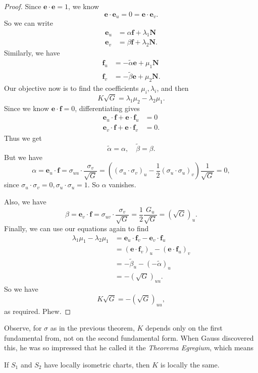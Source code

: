 \documentclass[a4paper]{article}
\begin{document}
\begin{proof}
  Since $\mathbf{e} \cdot \mathbf{e} = 1$, we know
  \[
    \mathbf{e}\cdot \mathbf{e}_u = 0 = \mathbf{e}\cdot \mathbf{e}_v.
  \]
  So we can write
  \begin{align*}
    \mathbf{e}_u &= \alpha \mathbf{f} + \lambda_1 \mathbf{N}\\
    \mathbf{e}_v &= \beta \mathbf{f} + \lambda_2 \mathbf{N}.
  \end{align*}
  Similarly, we have
  \begin{align*}
    \mathbf{f}_u &= -\tilde{\alpha}\mathbf{e} + \mu_1 \mathbf{N}\\
    \mathbf{f}_v &= -\tilde{\beta}\mathbf{e} + \mu_2 \mathbf{N}.
  \end{align*}
  Our objective now is to find the coefficients $\mu_i, \lambda_i$, and then
  \[
    K\sqrt{G} = \lambda_1 \mu_2 - \lambda_2 \mu_1.
  \]
  Since we know $\mathbf{e} \cdot \mathbf{f} = 0$, differentiating gives
  \begin{align*}
    \mathbf{e}_u \cdot \mathbf{f} + \mathbf{e}\cdot \mathbf{f}_u &= 0\\
    \mathbf{e}_v \cdot \mathbf{f} + \mathbf{e} \cdot \mathbf{f}_v &= 0.
  \end{align*}
  Thus we get
  \[
    \tilde{\alpha} = \alpha,\quad \tilde{\beta} = \beta.
  \]
  But we have
  \[
    \alpha = \mathbf{e}_u \cdot \mathbf{f} = \sigma_{uu}\cdot \frac{\sigma_v}{\sqrt{G}} = \left((\sigma_u \cdot \sigma_v)_u - \frac{1}{2} (\sigma_u \cdot \sigma_u)_v\right) \frac{1}{\sqrt{G}} = 0,
  \]
  since $\sigma_u \cdot \sigma_v = 0, \sigma_u \cdot \sigma_u = 1$. So $\alpha$ vanishes.
  
  Also, we have
  \[
    \beta = \mathbf{e}_v \cdot \mathbf{f} = \sigma_{uv} \cdot \frac{\sigma_v}{\sqrt{G}} = \frac{1}{2} \frac{G_u}{\sqrt{G}} = (\sqrt{G})_u.
  \]
  Finally, we can use our equations again to find
  \begin{align*}
    \lambda_1 \mu_1 - \lambda_2 \mu_1 &= \mathbf{e}_u \cdot \mathbf{f}_v - \mathbf{e}_v \cdot \mathbf{f}_u \\
    &= (\mathbf{e}\cdot \mathbf{f}_v)_u - (\mathbf{e}\cdot \mathbf{f}_u)_v \\
    &= -\tilde{\beta}_u - (-\tilde{\alpha})_u \\
    &= -(\sqrt{G})_{uu}.
  \end{align*}
  So we have
  \[
    K\sqrt{G} = -(\sqrt{G})_{uu},
  \]
  as required. Phew.
\end{proof}
Observe, for $\sigma$ as in the previous theorem, $K$ depends only on the first fundamental from, not on the second fundamental form. When Gauss discovered this, he was so impressed that he called it the \emph{Theorema Egregium}, which means
\begin{cor}
  If $S_1$ and $S_2$ have locally isometric charts, then $K$ is locally the same.
\end{cor}
\end{document}
